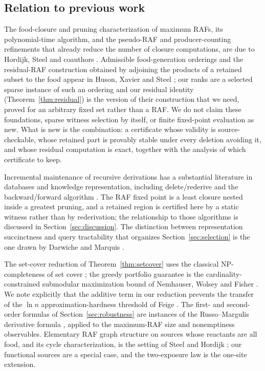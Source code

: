 \documentclass[11pt,a4paper]{article}
\theoremstyle{plain}
\theoremstyle{definition}
\theoremstyle{remark}
\begin{document}
\subsection{Relation to previous work}\label{sec:related}

The food-closure and pruning characterization of maximum RAFs, its polynomial-time algorithm, and the pseudo-RAF and producer-counting refinements that already reduce the number of closure computations, are due to Hordijk, Steel and coauthors \citep{hordijk2004,hordijk2015}. Admissible food-generation orderings and the residual-RAF construction obtained by adjoining the products of a retained subset to the food appear in Huson, Xavier and Steel \citep{huson2024}; our ranks are a selected sparse instance of such an ordering and our residual identity (Theorem~\ref{thm:residual}) is the version of their construction that we need, proved for an arbitrary fixed set rather than a RAF. We do not claim these foundations, sparse witness selection by itself, or finite fixed-point evaluation as new. What is new is the combination: a certificate whose validity is source-checkable, whose retained part is provably stable under every deletion avoiding it, and whose residual computation is exact, together with the analysis of which certificate to keep.

Incremental maintenance of recursive derivations has a substantial literature in databases and knowledge representation, including delete/rederive \citep{gupta1993} and the backward/forward algorithm \citep{motik2015}. The RAF fixed point is a least closure nested inside a greatest pruning, and a retained region is certified here by a static witness rather than by rederivation; the relationship to those algorithms is discussed in Section~\ref{sec:discussion}. The distinction between representation succinctness and query tractability that organizes Section~\ref{sec:selection} is the one drawn by Darwiche and Marquis \citep{darwiche2002}.

The set-cover reduction of Theorem~\ref{thm:setcover} uses the classical NP-completeness of set cover \citep{karp1972}; the greedy portfolio guarantee is the cardinality-constrained submodular maximization bound of Nemhauser, Wolsey and Fisher \citep{nemhauser1978}. We note explicitly that the additive term in our reduction prevents the transfer of the $\ln n$ approximation-hardness threshold of Feige \citep{feige1998}. The first- and second-order formulas of Section~\ref{sec:robustness} are instances of the Russo--Margulis derivative formula \citep{margulis1974,russo1981,odonnell2014}, applied to the maximum-RAF size and nonemptiness observables. Elementary RAF graph structure on sources whose reactants are all food, and its cycle characterization, is the setting of Steel and Hordijk \citep{steel2018}; our functional sources are a special case, and the two-exposure law is the one-site extension.
\end{document}
